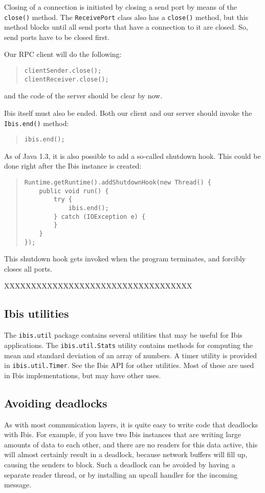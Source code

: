 \documentclass[10pt]{article}
\newcommand{\mysubsection}[1]{\subsection{#1}\label{#1}}
\begin{document}
Closing of a connection is initiated by closing a send port
by means of the \texttt{close()} method. The \texttt{ReceivePort}
class also has a \texttt{close()} method, but this method blocks
until all send ports that have a connection to it are closed.
So, send ports have to be closed first.

Our RPC client will do the following:

{\small
\begin{quote}
\begin{verbatim}
clientSender.close();
clientReceiver.close();
\end{verbatim}
\end{quote}
}
and the code of the server should be clear by now.

Ibis itself must also be ended. Both our client and our server
should invoke the \texttt{Ibis.end()} method:
{\small
\begin{quote}
\begin{verbatim}
ibis.end();
\end{verbatim}
\end{quote}
}

As of Java 1.3, it is also possible to add a so-called shutdown hook.
This could be done right after the Ibis instance is created:
{\small
\begin{quote}
\begin{verbatim}
Runtime.getRuntime().addShutdownHook(new Thread() {
    public void run() {
        try {
            ibis.end();
        } catch (IOException e) {
        }
    }
});
\end{verbatim}
\end{quote}
}
\noindent
This shutdown hook gets invoked when the program terminates, and
forcibly closes all ports.

XXXXXXXXXXXXXXXXXXXXXXXXXXXXXXXXXXX

\mysubsection{Ibis utilities}

The \texttt{ibis.util} package contains several utilities that may be
useful for Ibis applications.
The \texttt{ibis.util.Stats} utility contains methods for computing
the mean and standard deviation of an array of numbers.
A timer utility is provided in \texttt{ibis.util.Timer}.
See the Ibis API for other utilities. Most of these are used in
Ibis implementations, but may have other uses.

\mysubsection{Avoiding deadlocks}

As with most communication layers, it is quite easy to write code that
deadlocks with Ibis. For example, if you have two Ibis instances that
are writing large amounts of data to each other, and there are no
readers for this data active, this will almost certainly result in a deadlock,
because network buffers will fill up, causing the senders to block.
Such a deadlock can be avoided by having a separate reader thread,
or by installing an upcall handler for the incoming message.
\end{document}
